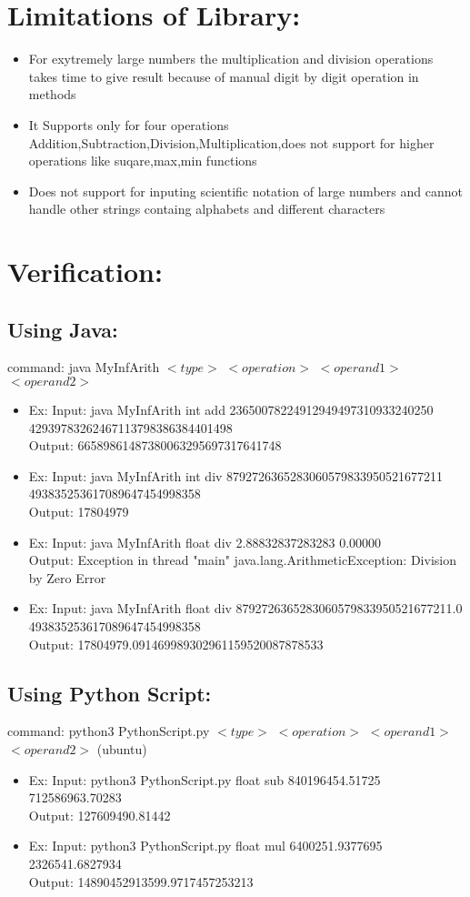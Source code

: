 \documentclass{article}
\begin{document}
\section*{Limitations of Library:}
\begin{itemize}
    \item For exytremely large numbers the multiplication and division operations takes time to give result because of manual digit by digit operation in methods
    \item It Supports only for four operations Addition,Subtraction,Division,Multiplication,does not support for higher operations like suqare,max,min functions
    \item Does not support for inputing scientific notation of large numbers and cannot handle other strings containg alphabets and different characters
    
\end{itemize}

\section*{Verification:}
\subsection*{Using Java:}
command: java MyInfArith $<type>$ $<operation>$ $<operand1>$ $<operand2>$
\begin{itemize}
    \item Ex:  Input: java MyInfArith int add 23650078224912949497310933240250
42939783262467113798386384401498 \\
Output: 66589861487380063295697317641748
   \item Ex:  Input: java MyInfArith int div 8792726365283060579833950521677211
493835253617089647454998358\\
Output: 17804979
\item Ex: Input: java MyInfArith float div 2.88832837283283 0.00000\\
Output: Exception in thread "main" java.lang.ArithmeticException: Division by Zero Error
\item Ex: Input: java MyInfArith float div 8792726365283060579833950521677211.0
493835253617089647454998358\\
Output: 17804979.091469989302961159520087878533

\end{itemize}
\subsection*{Using Python Script:}
command: python3 PythonScript.py $<type>$ $<operation>$ $<operand1>$ $<operand2>$ 
  (ubuntu)
\begin{itemize}
    \item Ex: Input:  python3 PythonScript.py float sub 840196454.51725 712586963.70283\\
    Output: 127609490.81442
    \item Ex: Input:  python3 PythonScript.py float mul 6400251.9377695 2326541.6827934\\
    Output: 14890452913599.9717457253213 
\end{itemize}
\end{document}
